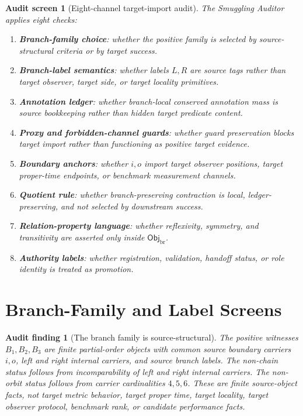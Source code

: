 \documentclass[11pt]{article}
\newcommand{\ObjBr}{\mathsf{Obj}_{\mathrm{br}}}
\newtheorem{auditscreen}{Audit screen}
\newtheorem{auditfinding}{Audit finding}
\begin{document}
\begin{auditscreen}[Eight-channel target-import audit]
The Smuggling Auditor applies eight checks:
\begin{enumerate}
    \item \textbf{Branch-family choice}: whether the positive family is
    selected by source-structural criteria or by target success.
    \item \textbf{Branch-label semantics}: whether labels \(L,R\) are
    source tags rather than target observer, target side, or target
    locality primitives.
    \item \textbf{Annotation ledger}: whether branch-local conserved
    annotation mass is source bookkeeping rather than hidden target
    predicate content.
    \item \textbf{Proxy and forbidden-channel guards}: whether guard
    preservation blocks target import rather than functioning as positive
    target evidence.
    \item \textbf{Boundary anchors}: whether \(i,o\) import target
    observer positions, target proper-time endpoints, or benchmark
    measurement channels.
    \item \textbf{Quotient rule}: whether branch-preserving contraction
    is local, ledger-preserving, and not selected by downstream success.
    \item \textbf{Relation-property language}: whether reflexivity,
    symmetry, and transitivity are asserted only inside \(\ObjBr\).
    \item \textbf{Authority labels}: whether registration, validation,
    handoff status, or role identity is treated as promotion.
\end{enumerate}
\end{auditscreen}

\section{Branch-Family and Label Screens}

\begin{auditfinding}[The branch family is source-structural]
The positive witnesses \(B_{1},B_{2},B_{3}\) are finite partial-order
objects with common source boundary carriers \(i,o\), left and right
internal carriers, and source branch labels. The non-chain status follows
from incomparability of left and right internal carriers. The non-orbit
status follows from carrier cardinalities \(4,5,6\). These are finite
source-object facts, not target metric behavior, target proper time,
target locality, target observer protocol, benchmark rank, or candidate
performance facts.
\end{auditfinding}
\end{document}
